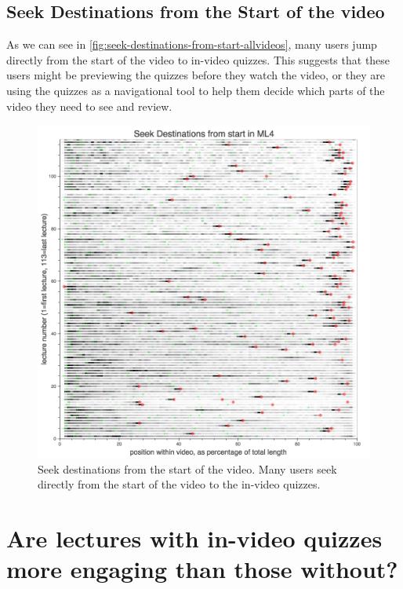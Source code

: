 \documentclass{sigchi}
\begin{document}
\subsection{Seek Destinations from the Start of the video}

As we can see in \autoref{fig:seek-destinations-from-start-allvideos}, many users jump directly from the start of the video to in-video quizzes. This suggests that these users might be previewing the quizzes before they watch the video, or they are using the quizzes as a navigational tool to help them decide which parts of the video they need to see and review.

\begin{figure}
\includegraphics[width=1.0\columnwidth]{seek-destinations-from-start-allvideos}
\caption{Seek destinations from the start of the video. Many users seek directly from the start of the video to the in-video quizzes.}
\label{fig:seek-destinations-from-start-allvideos}
\end{figure}


\section{Are lectures with in-video quizzes more engaging than those without?}
\end{document}
